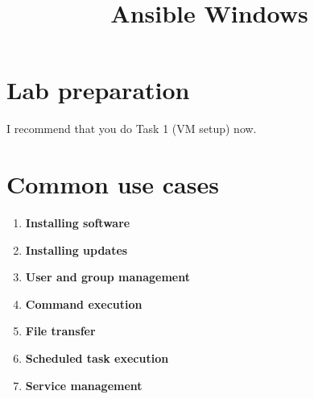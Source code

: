 \documentclass[slides]{pgnotes}
\title{Ansible Windows}
\begin{document}
\maketitle

\tableofcontents

\section{Lab preparation}

I recommend that you do Task 1 (VM setup) now.


\section{Common use cases}

\begin{enumerate}

From ansible guide: 

\item \textbf{Installing software}

\item \textbf{Installing updates}

\item \textbf{User and group management}

\item \textbf{Command execution}

\item \textbf{File transfer}

\item \textbf{Scheduled task execution}

\item \textbf{Service management}

\end{enumerate}
\end{document}
